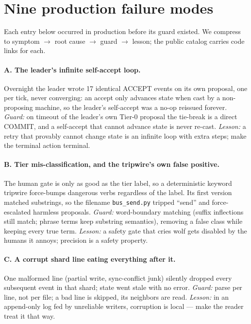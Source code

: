\documentclass[11pt]{article}
\begin{document}
\section{Nine production failure modes}\label{sec:failures}
Each entry below occurred in production before its guard existed. We compress to symptom $\to$ root cause $\to$ guard $\to$ lesson; the public catalog carries code links for each.

\paragraph{A. The leader's infinite self-accept loop.} Overnight the leader wrote 17 identical ACCEPT events on its own proposal, one per tick, never converging: an accept only advances state when cast by a non-proposing machine, so the leader's self-accept was a no-op reissued forever. \emph{Guard:} on timeout of the leader's own Tier-0 proposal the tie-break is a direct COMMIT, and a self-accept that cannot advance state is never re-cast. \emph{Lesson:} a retry that provably cannot change state is an infinite loop with extra steps; make the terminal action terminal.

\paragraph{B. Tier mis-classification, and the tripwire's own false positive.} The human gate is only as good as the tier label, so a deterministic keyword tripwire force-bumps dangerous verbs regardless of the label. Its first version matched substrings, so the filename \texttt{bus\_send.py} tripped ``send'' and force-escalated harmless proposals. \emph{Guard:} word-boundary matching (suffix inflections still match; phrase terms keep substring semantics), removing a false class while keeping every true term. \emph{Lesson:} a safety gate that cries wolf gets disabled by the humans it annoys; precision is a safety property.

\paragraph{C. A corrupt shard line eating everything after it.} One malformed line (partial write, sync-conflict junk) silently dropped every subsequent event in that shard; state went stale with no error. \emph{Guard:} parse per line, not per file; a bad line is skipped, its neighbors are read. \emph{Lesson:} in an append-only log fed by unreliable writers, corruption is local --- make the reader treat it that way.
\end{document}
